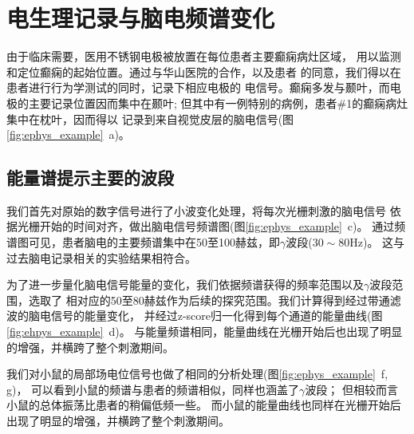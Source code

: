 
\section{电生理记录与脑电频谱变化}
由于临床需要，医用不锈钢电极被放置在每位患者主要癫痫病灶区域，
用以监测和定位癫痫的起始位置。通过与华山医院的合作，以及患者
的同意，我们得以在患者进行行为学测试的同时，记录下相应电极的
电信号。癫痫多发与颞叶，而电极的主要记录位置因而集中在颞叶;
但其中有一例特别的病例，患者\#1的癫痫病灶集中在枕叶，因而得以
记录到来自视觉皮层的脑电信号(图\ref{fig:ephys_example}~a)。

\subsection{能量谱提示主要的波段}
我们首先对原始的数字信号进行了小波变化处理，将每次光栅刺激的脑电信号
依据光栅开始的时间对齐，做出脑电信号频谱图(图\ref{fig:ephys_example}~c)。
通过频谱图可见，患者脑电的主要频谱集中在50至100赫兹，即\(\gamma\)波段(\(30 \sim 80 \text{Hz}\))。
这与过去脑电记录相关的实验结果相符合\cite{todo}。%

为了进一步量化脑电信号能量的变化，我们依据频谱获得的频率范围以及\(\gamma\)波段范围，选取了
相对应的50至80赫兹作为后续的探究范围。我们计算得到经过带通滤波的脑电信号的能量变化，
并经过z-score归一化得到每个通道的能量曲线(图\ref{fig:ehpys_example}~d)。
与能量频谱相同，能量曲线在光栅开始后也出现了明显的增强，并横跨了整个刺激期间。

我们对小鼠的局部场电位信号也做了相同的分析处理(图\ref{fig:ephys_example}~f, g)，
可以看到小鼠的频谱与患者的频谱相似，同样也涵盖了\(\gamma\)波段；
但相较而言小鼠的总体振荡比患者的稍偏低频一些。
而小鼠的能量曲线也同样在光栅开始后出现了明显的增强，并横跨了整个刺激期间。


